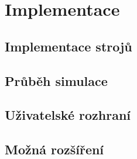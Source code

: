 \chapter{Implementace}
\label{sec:implementation}

\section{Implementace strojů}
\label{sec:machine_impl}

\section{Průběh simulace}

\section{Uživatelské rozhraní}

\section{Možná rozšíření}